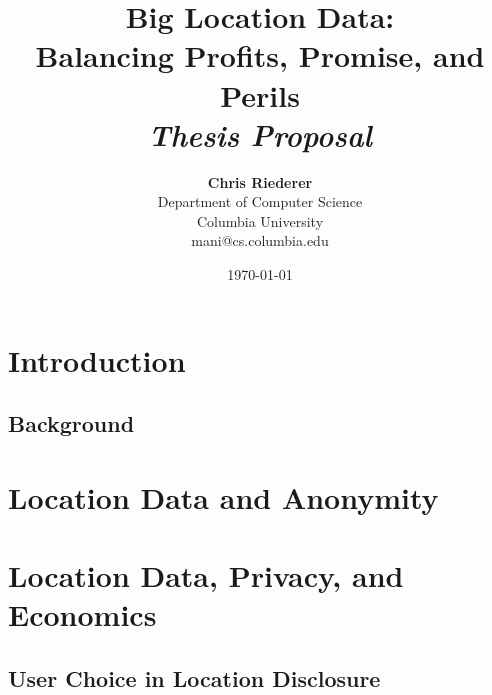 \documentclass[12pt]{report}
\title{{\bf Big Location Data: \\ Balancing Profits, Promise, and Perils} \\
\it Thesis Proposal}
\author{ {\bf Chris Riederer}  \\
Department of Computer Science \\
Columbia University\\
{\small mani@cs.columbia.edu}
}
\date{\today}
\begin{document}
\pagestyle{plain}
\maketitle

\pagebreak
\begin{abstract}

\end{abstract}

\pagebreak
\tableofcontents
\pagebreak

\cleardoublepage
{}

\chapter{Introduction}
\label{ch:intro}

  \section{Background}
  \label{sec:background}
  


\chapter{Location Data and Anonymity}
\label{sec:anon}



\chapter{Location Data, Privacy, and Economics}
\label{sec:econ}


  \section{User Choice in Location Disclosure}
  \label{sec:keyword}
  
\end{document}
